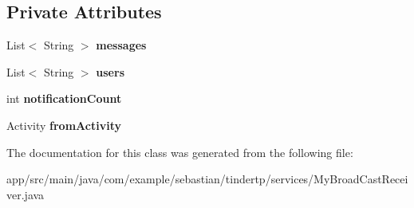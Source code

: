 \subsection*{Private Attributes}
\begin{DoxyCompactItemize}
\item 
List$<$ String $>$ {\bfseries messages}\hypertarget{classcom_1_1example_1_1sebastian_1_1tindertp_1_1services_1_1MyBroadCastReceiver_a4d00d931616c19fc017984fcc687e435}{}\label{classcom_1_1example_1_1sebastian_1_1tindertp_1_1services_1_1MyBroadCastReceiver_a4d00d931616c19fc017984fcc687e435}

\item 
List$<$ String $>$ {\bfseries users}\hypertarget{classcom_1_1example_1_1sebastian_1_1tindertp_1_1services_1_1MyBroadCastReceiver_a9c1e37e5fda37f7633e060f0a9fd53ea}{}\label{classcom_1_1example_1_1sebastian_1_1tindertp_1_1services_1_1MyBroadCastReceiver_a9c1e37e5fda37f7633e060f0a9fd53ea}

\item 
int {\bfseries notification\+Count}\hypertarget{classcom_1_1example_1_1sebastian_1_1tindertp_1_1services_1_1MyBroadCastReceiver_afd3754ea7e9900b19567a3a8e9caf5b1}{}\label{classcom_1_1example_1_1sebastian_1_1tindertp_1_1services_1_1MyBroadCastReceiver_afd3754ea7e9900b19567a3a8e9caf5b1}

\item 
Activity {\bfseries from\+Activity}\hypertarget{classcom_1_1example_1_1sebastian_1_1tindertp_1_1services_1_1MyBroadCastReceiver_a92413fc047d440ec64df578acdd3b8f6}{}\label{classcom_1_1example_1_1sebastian_1_1tindertp_1_1services_1_1MyBroadCastReceiver_a92413fc047d440ec64df578acdd3b8f6}

\end{DoxyCompactItemize}


The documentation for this class was generated from the following file\+:\begin{DoxyCompactItemize}
\item 
app/src/main/java/com/example/sebastian/tindertp/services/My\+Broad\+Cast\+Receiver.\+java\end{DoxyCompactItemize}
